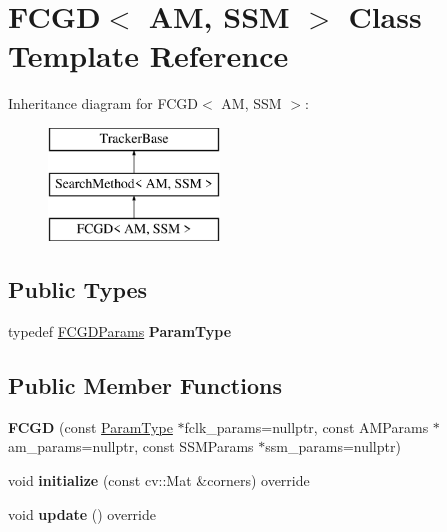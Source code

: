 \hypertarget{classFCGD}{\section{F\-C\-G\-D$<$ A\-M, S\-S\-M $>$ Class Template Reference}
\label{classFCGD}
}
Inheritance diagram for F\-C\-G\-D$<$ A\-M, S\-S\-M $>$\-:\begin{figure}[H]
\begin{center}
\leavevmode
\includegraphics[height=3.000000cm]{classFCGD}
\end{center}
\end{figure}
\subsection*{Public Types}
\begin{DoxyCompactItemize}
\item 
\hypertarget{classFCGD_ace4dce4f0076cc0603d3bb9e714f2551}{typedef \hyperlink{structFCGDParams}{F\-C\-G\-D\-Params} {\bfseries Param\-Type}}\label{classFCGD_ace4dce4f0076cc0603d3bb9e714f2551}

\end{DoxyCompactItemize}
\subsection*{Public Member Functions}
\begin{DoxyCompactItemize}
\item 
\hypertarget{classFCGD_a3e2cd1f6442e1cd884044a4707a7a341}{{\bfseries F\-C\-G\-D} (const \hyperlink{structFCGDParams}{Param\-Type} $\ast$fclk\-\_\-params=nullptr, const A\-M\-Params $\ast$am\-\_\-params=nullptr, const S\-S\-M\-Params $\ast$ssm\-\_\-params=nullptr)}\label{classFCGD_a3e2cd1f6442e1cd884044a4707a7a341}

\item 
\hypertarget{classFCGD_ae07900bd460d62121bf64dae87936ef7}{void {\bfseries initialize} (const cv\-::\-Mat \&corners) override}\label{classFCGD_ae07900bd460d62121bf64dae87936ef7}

\item 
\hypertarget{classFCGD_a6cf36f8418a08bd9106d7da61bf20462}{void {\bfseries update} () override}\label{classFCGD_a6cf36f8418a08bd9106d7da61bf20462}

\end{DoxyCompactItemize}
